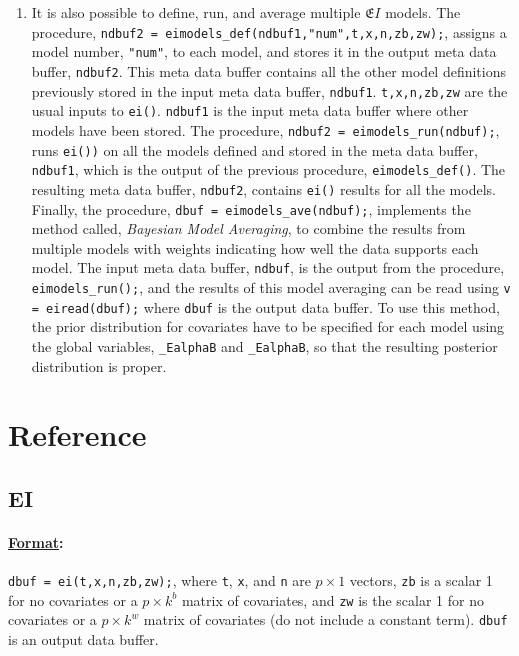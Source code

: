 \documentclass[11pt,titlepage]{article}
\newcommand{\EI}{\ensuremath{{\mathfrak EI}}}
\begin{document}
\begin{enumerate}
\item It is also possible to define, run, and average multiple \EI
  models.  The procedure, \texttt{ndbuf2 =
    eimodels\_def(ndbuf1,"num",t,x,n,zb,zw);}, assigns a model number,
  \texttt{"num"}, to each model, and stores it in the output meta data
  buffer, \texttt{ndbuf2}. This meta data buffer contains all the
  other model definitions previously stored in the input meta data
  buffer, \texttt{ndbuf1}.  \texttt{t,x,n,zb,zw} are the usual inputs
  to \texttt{ei()}.  \texttt{ndbuf1} is the input meta data buffer
  where other models have been stored. The procedure, \texttt{ndbuf2 =
    eimodels\_run(ndbuf);}, runs \texttt{ei())} on all the models
  defined and stored in the meta data buffer, \texttt{ndbuf1}, which
  is the output of the previous procedure, \texttt{eimodels\_def()}.
  The resulting meta data buffer, \texttt{ndbuf2}, contains
  \texttt{ei()} results for all the models.  Finally, the procedure,
  \texttt{dbuf = eimodels\_ave(ndbuf);}, implements the method called,
  \textit{Bayesian Model Averaging}, to combine the results from
  multiple models with weights indicating how well the data supports
  each model.  The input meta data buffer, \texttt{ndbuf}, is the
  output from the procedure, \texttt{eimodels\_run();}, and the
  results of this model averaging can be read using \texttt{v =
    eiread(dbuf);} where \texttt{dbuf} is the output data buffer. To
  use this method, the prior distribution for covariates have to be
  specified for each model using the global variables,
  \texttt{\_EalphaB} and \texttt{\_EalphaB}, so that the resulting
  posterior distribution is proper.

\end{enumerate}

\section{Reference}

\subsection{EI} \label{ei}

\paragraph{\underline{Format}:} \texttt{dbuf = ei(t,x,n,zb,zw);}, where
\texttt{t}, \texttt{x}, and \texttt{n} are $p\times 1$ vectors,
\texttt{zb} is a scalar 1 for no covariates or a $p\times k^b$ matrix
of covariates, and \texttt{zw} is the scalar 1 for no covariates or a
$p\times k^w$ matrix of covariates (do not include a constant term).
\texttt{dbuf} is an output data buffer.
\end{document}
